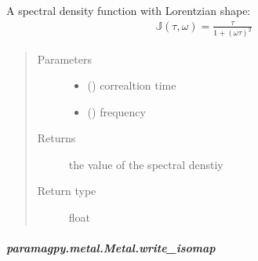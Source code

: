 \documentclass[a4paper,10pt,english,openany,oneside]{sphinxmanual}
\begin{document}
\begin{fulllineitems}
\begin{fulllineitems}
\begin{fulllineitems}
\label{\detokenize{reference/generated/paramagpy.metal.Metal.spec_dens:paramagpy.metal.Metal.spec_dens}}
A spectral density function with Lorentzian shape:
\begin{equation*}
\begin{split}\mathbb{J}(\tau,\omega)=\frac{\tau}{1+(\omega\tau)^2}\end{split}
\end{equation*}\begin{quote}\begin{description}
\item[{Parameters}] \leavevmode\begin{itemize}
\item {} 
 () \textendash{} correaltion time

\item {} 
 () \textendash{} frequency

\end{itemize}

\item[{Returns}] \leavevmode
{} \textendash{} the value of the spectral denstiy

\item[{Return type}] \leavevmode
float

\end{description}\end{quote}

\end{fulllineitems}



\subparagraph{paramagpy.metal.Metal.write\_isomap}
\label{\detokenize{reference/generated/paramagpy.metal.Metal.write_isomap:paramagpy-metal-metal-write-isomap}}\label{\detokenize{reference/generated/paramagpy.metal.Metal.write_isomap::doc}}


\end{fulllineitems}
\end{fulllineitems}
\end{document}
